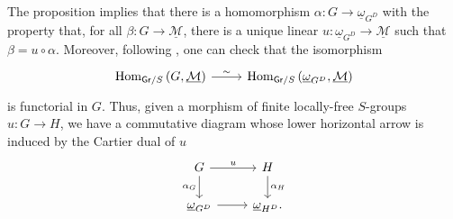 \begin{rem}[]\label{rem:ReprMorExt}
	The proposition implies that there is
	a homomorphism $\alpha\colon G \to \underline{\omega}_{G^D}$
	with the property that, for all $\beta\colon G \to \underline{\mathcal{M}}$,
	there is a unique linear $u\colon \underline{\omega}_{G^D} \to \underline{\mathcal{M}}$
	such that $\beta = u \circ \alpha$.
	Moreover, following {\cite[Chapter IV, remark 1.6]{Messing}},
	one can check that the isomorphism
	\begin{equation*}
	\begin{tikzcd}[row sep = 0ex
		,/tikz/column 1/.append style={anchor=base east}
		,/tikz/column 2/.append style={anchor=base west}]
		\Hom_{\mathsf{Gr}/S} \left( G, \underline{\mathcal{M}} \right)
		\arrow[r, "\sim", rightarrow] &
		\Hom_{\mathsf{Gr}/S} \left( \underline{\omega}_{G^D}, \underline{\mathcal{M}} \right)
	\end{tikzcd}
	\end{equation*} 
	is functorial in $G$.
	Thus, given a morphism of finite locally-free $S$-groups $u\colon G \to H$,
	we have a commutative diagram whose lower horizontal arrow is
	induced by the Cartier dual of $u$
	\begin{equation}\label{diag:functorialityRepresent}
	\begin{tikzcd}
		G \arrow[r, "u", rightarrow] 
		\arrow[d, "\alpha_G"', rightarrow] &
		H \arrow[d, "\alpha_H", rightarrow] \\
		\underline{\omega}_{G^D} \arrow[r, "", rightarrow] &
		\underline{\omega}_{H^D}
	.\end{tikzcd}
	\end{equation}
\end{rem}


